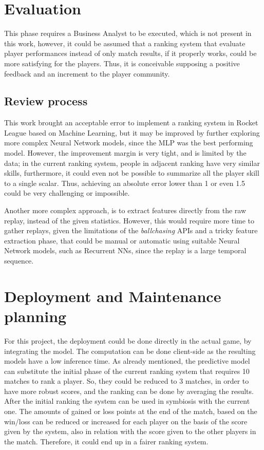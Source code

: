 \section{Evaluation}

This phase requires a Business Analyst to be executed, which is not present in this work, however, it could be assumed that a ranking system that evaluate player performances instead of only match results, if it properly works, could be more satisfying for the players. Thus, it is conceivable supposing a positive feedback and an increment to the player community.
\subsection{Review process}

This work brought an acceptable error to implement a ranking system in Rocket League based on Machine Learning, but it may be improved by further exploring more complex Neural Network models, since the MLP was the best performing model. However, the improvement margin is very tight, and is limited by the data; in the current ranking system, people in adjacent ranking have very similar skills, furthermore, it could even not be possible to summarize all the player skill to a single scalar. Thus, achieving an absolute error lower than 1 or even 1.5 could be very challenging or impossible.

Another more complex approach, is to extract features directly from the raw replay, instead of the given statistics. However, this would require more time to gather replays, given the limitations of the \textit{ballchasing} APIs and a tricky feature extraction phase, that could be manual or automatic using suitable Neural Network models, such as Recurrent NNs, since the replay is a large temporal sequence.


\section{Deployment and Maintenance planning}

For this project, the deployment could be done directly in the actual game, by integrating the model. The computation can be done client-side as the resulting models have a low inference time. As already mentioned, the predictive model can substitute the initial phase of the current ranking system that requires 10 matches to rank a player. So, they could be reduced to 3 matches, in order to have more robust scores, and the ranking can be done by averaging the results. After the initial ranking the system can be used in symbiosis with the current one. The amounts of gained or loss points at the end of the match, based on the win/loss can be reduced or increased for each player on the basis of the score given by the system, also in relation with the score given to the other players in the match. Therefore, it could end up in a fairer ranking system.

